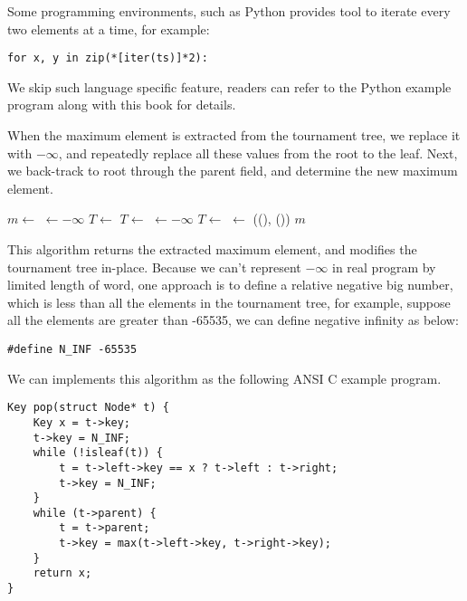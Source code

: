 \documentclass{article}
\begin{document}
Some programming environments, such as Python provides tool to iterate every two elements
at a time, for example:

\lstset{language=Python}
\begin{lstlisting}
for x, y in zip(*[iter(ts)]*2):
\end{lstlisting}

We skip such language specific feature, readers can refer to the Python example program
along with this book for details.

When the maximum element is extracted from the tournament tree, we replace it with $-\infty$,
and repeatedly replace all these values from the root to the leaf. Next, we back-track
to root through the parent field, and determine the new maximum element.

\begin{algorithmic}
  \State $m \gets$ 
  \State {} $\gets -\infty$
    
      \State $T \gets$ 
    \Else
      \State $T \gets$ 
    \EndIf
    \State {} $\gets -\infty$
  \EndWhile
   
    \State $T \gets$ 
    \State {} $\gets$ ((), ())
  \EndWhile
  \State \Return $m$
\EndFunction
\end{algorithmic}

This algorithm returns the extracted maximum element, and modifies the tournament tree in-place.
Because we can't represent $-\infty$ in real program by limited length of word, one approach is to define
a relative negative big number, which is less than all the elements in the tournament tree, for example,
suppose all the elements are greater than -65535, we can define negative infinity as below:

\lstset{language=C}
\begin{lstlisting}
#define N_INF -65535
\end{lstlisting}

We can implements this algorithm as the following ANSI C example program.

\lstset{language=C}
\begin{lstlisting}
Key pop(struct Node* t) {
    Key x = t->key;
    t->key = N_INF;
    while (!isleaf(t)) {
        t = t->left->key == x ? t->left : t->right;
        t->key = N_INF;
    }
    while (t->parent) {
        t = t->parent;
        t->key = max(t->left->key, t->right->key);
    }
    return x;
}
\end{lstlisting}
\end{document}
